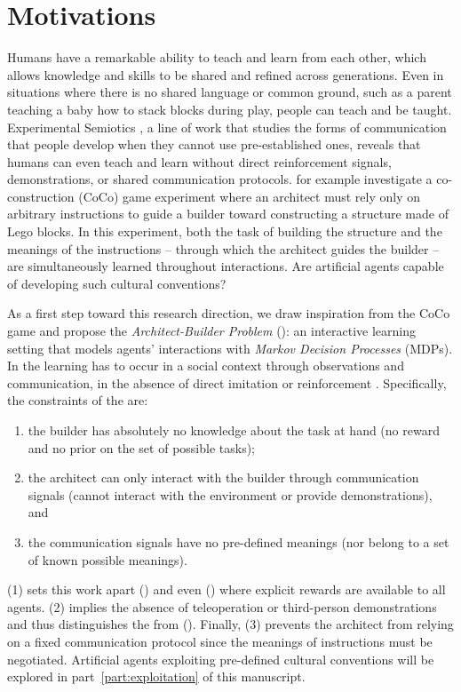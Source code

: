 \section{Motivations}

Humans have a remarkable ability to teach and learn from each other, which allows knowledge and skills to be shared and refined across generations. Even in situations where there is no shared language or common ground, such as a parent teaching a baby how to stack blocks during play, people can teach and be taught. Experimental Semiotics \citep{galantucci2011experimental}, a line of work that studies the forms of communication that people develop when they cannot use pre-established ones, reveals that humans can even teach and learn without direct reinforcement signals, demonstrations, or shared communication protocols. \citet{vollmer2014studying} for example investigate a co-construction (CoCo) game experiment where an architect must rely only on arbitrary instructions to guide a builder toward constructing a structure made of Lego blocks. In this experiment, both the task of building the structure and the meanings of the instructions -- through which the architect guides the builder -- are simultaneously learned throughout interactions. Are artificial agents capable of developing such cultural conventions?

As a first step toward this research direction, we draw inspiration from the CoCo game and propose the \textit{Architect-Builder Problem} (\abp): an interactive learning setting that models agents' interactions with \textit{Markov Decision Processes} \citep{puterman2014markov} (MDPs). 
In the \abp learning has to occur in a social context through observations and communication, in the absence of direct imitation or reinforcement \citep{bandura1977social}. Specifically, the constraints of the \abp are:

\begin{enumerate}[noitemsep,topsep=0pt]
\item the builder has absolutely no knowledge about the task at hand (no reward and no prior on the set of possible tasks);
\item the architect can only interact with the builder through communication signals (cannot interact with the environment or provide demonstrations), and
\item the communication signals have no pre-defined meanings (nor belong to a set of known possible meanings).
\end{enumerate} 
(1) sets this work apart \rl () and even \marl () where explicit rewards are available to all  agents. (2) implies the absence of teleoperation or third-person demonstrations and thus distinguishes the \abp from \il (). Finally, (3) prevents the architect from relying on a fixed communication protocol since the meanings of instructions must be negotiated. Artificial agents exploiting pre-defined cultural conventions will be explored in part~\ref{part:exploitation} of this manuscript. 

